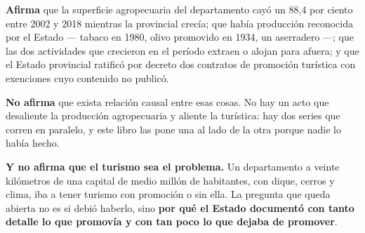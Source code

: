 \begin{cautela}
\textbf{Afirma} que la superficie agropecuaria del departamento cayó un 88,4 por ciento entre
2002 y 2018 mientras la provincial crecía; que había producción reconocida por el Estado ---
tabaco en 1980, olivo promovido en 1934, un aserradero ---; que las dos actividades que
crecieron en el período extraen o alojan para afuera; y que el Estado provincial ratificó por
decreto dos contratos de promoción turística con exenciones cuyo contenido no publicó.

\textbf{No afirma} que exista relación causal entre esas cosas. No hay un acto que desaliente
la producción agropecuaria y aliente la turística: hay dos series que corren en paralelo, y
este libro las pone una al lado de la otra porque nadie lo había hecho.

\textbf{Y no afirma que el turismo sea el problema.} Un departamento a veinte kilómetros de una
capital de medio millón de habitantes, con dique, cerros y clima, iba a tener turismo con
promoción o sin ella. La pregunta que queda abierta no es si debió haberlo, sino
\textbf{por qué el Estado documentó con tanto detalle lo que promovía y con tan poco lo que
dejaba de promover}.
\end{cautela}

